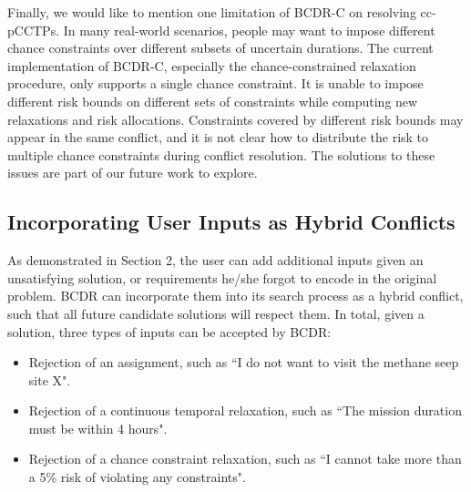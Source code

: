 \documentclass[jair,twoside,11pt,theapa]{article}
\begin{document}


Finally, we would like to mention one limitation of BCDR-C on resolving
cc-pCCTPs. In many real-world scenarios, people may want to impose different chance
constraints over different subsets of uncertain durations. The current
implementation of BCDR-C, especially the chance-constrained relaxation
procedure, only supports a single chance constraint. It is unable to impose
different risk bounds on different sets of constraints while computing new
relaxations and risk allocations. Constraints covered by different risk bounds
may appear in the same conflict, and it is not clear how to distribute the risk
to multiple chance constraints during conflict resolution. The solutions to
these issues are part of our future work to explore.


\subsection{Incorporating User Inputs as Hybrid Conflicts}  


As demonstrated in Section 2, the user can add additional inputs given an
unsatisfying solution, or requirements he/she forgot to encode in the original
problem. BCDR can incorporate them into its search process as a hybrid conflict,
such that all future candidate solutions will respect them. In total, given a
solution, three types of inputs can be accepted by BCDR:

\begin{itemize}
	
	
	\item Rejection of an assignment, such as ``I do not want to visit the methane seep
	site X".
	
	
	\item Rejection of a continuous temporal relaxation, such as ``The mission duration must be
	within 4 hours".
	
	
	\item Rejection of a chance constraint relaxation, such as ``I cannot take more
	than a 5\% risk of violating any constraints".
	
\end{itemize}
\end{document}
